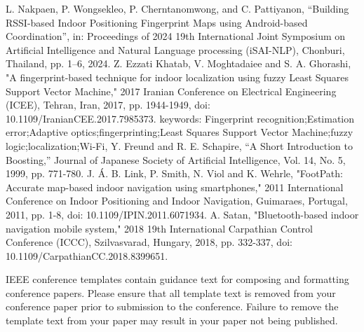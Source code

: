 \documentclass[conference]{IEEEtran}
\begin{document}
\begin{thebibliography}{00}
		L. Nakpaen, P. Wongsekleo, P. Cherntanomwong, and C. Pattiyanon, “Building RSSI-based Indoor Positioning Fingerprint Maps using Android-based Coordination”, in: Proceedings of 2024 19th International Joint Symposium on Artificial Intelligence and Natural Language processing (iSAI-NLP), Chonburi, Thailand, pp. 1–6, 2024.
		Z. Ezzati Khatab, V. Moghtadaiee and S. A. Ghorashi, "A fingerprint-based technique for indoor localization using fuzzy Least Squares Support Vector Machine," 2017 Iranian Conference on Electrical Engineering (ICEE), Tehran, Iran, 2017, pp. 1944-1949, doi: 10.1109/IranianCEE.2017.7985373. keywords: {Fingerprint recognition;Estimation error;Adaptive optics;fingerprinting;Least Squares Support Vector Machine;fuzzy logic;localization;Wi-Fi},
		Y. Freund and R. E. Schapire, “A Short Introduction to Boosting,” Journal of Japanese Society of Artificial Intelligence, Vol. 14, No. 5, 1999, pp. 771-780.
		J. Á. B. Link, P. Smith, N. Viol and K. Wehrle, "FootPath: Accurate map-based indoor navigation using smartphones," 2011 International Conference on Indoor Positioning and Indoor Navigation, Guimaraes, Portugal, 2011, pp. 1-8, doi: 10.1109/IPIN.2011.6071934.
		A. Satan, "Bluetooth-based indoor navigation mobile system," 2018 19th International Carpathian Control Conference (ICCC), Szilvasvarad, Hungary, 2018, pp. 332-337, doi: 10.1109/CarpathianCC.2018.8399651.
		
	\end{thebibliography}
	\vspace{12pt}
	\color{red}
	IEEE conference templates contain guidance text for composing and formatting conference papers. Please ensure that all template text is removed from your conference paper prior to submission to the conference. Failure to remove the template text from your paper may result in your paper not being published.
	
\end{document}

